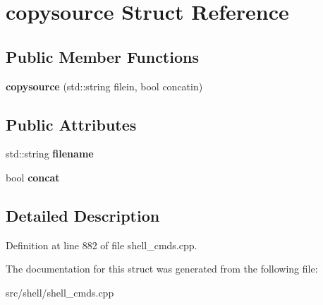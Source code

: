 \hypertarget{structcopysource}{\section{copysource Struct Reference}
\label{structcopysource}
}
\subsection*{Public Member Functions}
\begin{DoxyCompactItemize}
\item 
\hypertarget{structcopysource_a331ce01a5535122b9d07a69019377fef}{{\bfseries copysource} (std\-::string filein, bool concatin)}\label{structcopysource_a331ce01a5535122b9d07a69019377fef}

\end{DoxyCompactItemize}
\subsection*{Public Attributes}
\begin{DoxyCompactItemize}
\item 
\hypertarget{structcopysource_a53465278c86308205dd85bcb4277773d}{std\-::string {\bfseries filename}}\label{structcopysource_a53465278c86308205dd85bcb4277773d}

\item 
\hypertarget{structcopysource_afc69446550cf7febabeeba26122b0e84}{bool {\bfseries concat}}\label{structcopysource_afc69446550cf7febabeeba26122b0e84}

\end{DoxyCompactItemize}


\subsection{Detailed Description}


Definition at line 882 of file shell\-\_\-cmds.\-cpp.



The documentation for this struct was generated from the following file\-:\begin{DoxyCompactItemize}
\item 
src/shell/shell\-\_\-cmds.\-cpp\end{DoxyCompactItemize}
